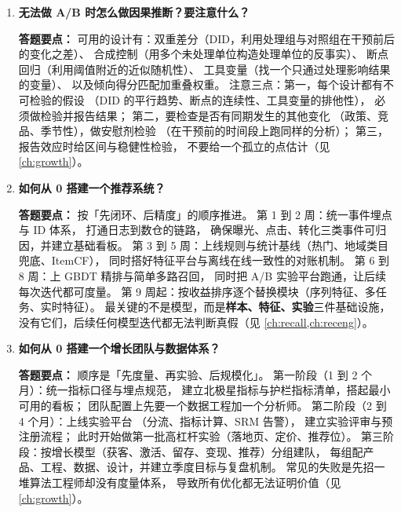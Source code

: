 \begin{interview}[题库与答题要点]

\begin{enumerate}[label=]

  \item[\textcolor{VioletDeep}{\textbf{Q132.}}] \textbf{无法做 A/B 时怎么做因果推断？要注意什么？}
\par\smallskip\noindent\textcolor{VioletDeep}{\textbf{答题要点：}}
可用的设计有：双重差分（DID，利用处理组与对照组在干预前后的变化之差）、
合成控制（用多个未处理单位构造处理单位的反事实）、
断点回归（利用阈值附近的近似随机性）、
工具变量（找一个只通过处理影响结果的变量）、
以及倾向得分匹配加重叠权重。
注意三点：第一，每个设计都有不可检验的假设
（DID 的平行趋势、断点的连续性、工具变量的排他性），
必须做检验并报告结果；
第二，要检查是否有同期发生的其他变化
（政策、竞品、季节性），做安慰剂检验
（在干预前的时间段上跑同样的分析）；
第三，报告效应时给区间与稳健性检验，
不要给一个孤立的点估计（见 \cref{ch:growth}）。

  \item[\textcolor{VioletDeep}{\textbf{Q133.}}] \textbf{如何从 0 搭建一个推荐系统？}
\par\smallskip\noindent\textcolor{VioletDeep}{\textbf{答题要点：}}
按「先闭环、后精度」的顺序推进。
第 1 到 2 周：统一事件埋点与 ID 体系，
打通日志到数仓的链路，
确保曝光、点击、转化三类事件可归因，并建立基础看板。
第 3 到 5 周：上线规则与统计基线（热门、地域类目兜底、ItemCF），
同时搭好特征平台与离线在线一致性的对账机制。
第 6 到 8 周：上 GBDT 精排与简单多路召回，
同时把 A/B 实验平台跑通，让后续每次迭代都可度量。
第 9 周起：按收益排序逐个替换模块（序列特征、多任务、实时特征）。
最关键的不是模型，而是\textbf{样本、特征、实验}三件基础设施，
没有它们，后续任何模型迭代都无法判断真假（见 \cref{ch:recall,ch:receng}）。

  \item[\textcolor{VioletDeep}{\textbf{Q134.}}] \textbf{如何从 0 搭建一个增长团队与数据体系？}
\par\smallskip\noindent\textcolor{VioletDeep}{\textbf{答题要点：}}
顺序是「先度量、再实验、后规模化」。
第一阶段（1 到 2 个月）：统一指标口径与埋点规范，
建立北极星指标与护栏指标清单，搭起最小可用的看板；
团队配置上先要一个数据工程加一个分析师。
第二阶段（2 到 4 个月）：上线实验平台
（分流、指标计算、SRM 告警），
建立实验评审与预注册流程；
此时开始做第一批高杠杆实验（落地页、定价、推荐位）。
第三阶段：按增长模型（获客、激活、留存、变现、推荐）分组建队，
每组配产品、工程、数据、设计，并建立季度目标与复盘机制。
常见的失败是先招一堆算法工程师却没有度量体系，
导致所有优化都无法证明价值（见 \cref{ch:growth}）。


\end{enumerate}
\end{interview}
